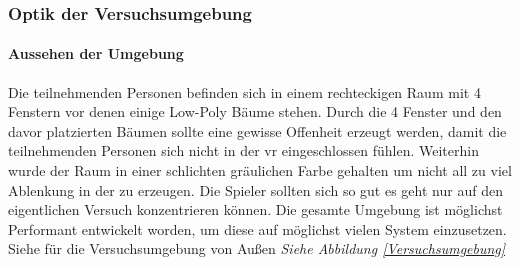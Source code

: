 \documentclass[a4paper,11pt]{article}%
\renewcommand{\\}{\vspace*{0.5\baselineskip} \newline}
\begin{document}
\newpage	
\subsubsection{Optik der Versuchsumgebung}
\paragraph{Aussehen der Umgebung}
Die teilnehmenden Personen befinden sich in einem rechteckigen Raum mit 4 Fenstern vor denen einige Low-Poly Bäume stehen. Durch die 4 Fenster und den davor platzierten Bäumen sollte eine gewisse Offenheit erzeugt werden, damit die teilnehmenden Personen sich nicht in der \ac{vr} eingeschlossen fühlen. Weiterhin wurde der Raum in einer schlichten gräulichen Farbe gehalten um nicht all zu viel Ablenkung in der zu erzeugen. Die Spieler sollten sich so gut es geht nur auf den eigentlichen Versuch konzentrieren können. Die gesamte Umgebung ist möglichst Performant entwickelt worden, um diese auf möglichst vielen System einzusetzen. Siehe für die Versuchsumgebung von Außen \textit{Siehe Abbildung \ref{Versuchsumgebung}} 
\end{document}

